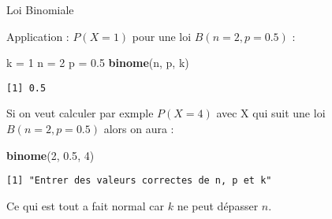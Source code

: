 \documentclass[
  ignorenonframetext,
]{beamer}
\newenvironment{Shaded}{\begin{snugshade}}{\end{snugshade}}
\newcommand{\DecValTok}[1]{\textcolor[rgb]{0.00,0.00,0.81}{#1}}
\newcommand{\FloatTok}[1]{\textcolor[rgb]{0.00,0.00,0.81}{#1}}
\newcommand{\FunctionTok}[1]{\textcolor[rgb]{0.13,0.29,0.53}{\textbf{#1}}}
\newcommand{\NormalTok}[1]{#1}
\newcommand{\OtherTok}[1]{\textcolor[rgb]{0.56,0.35,0.01}{#1}}
\begin{document}
\begin{frame}[fragile]{Loi Binomiale}
\protect\hypertarget{loi-binomiale-1}{}

Application : \(P(X=1)\) pour une loi \(B(n=2, p=0.5)\) :

\begin{Shaded}
\begin{Highlighting}[]
\NormalTok{k }\OtherTok{=} \DecValTok{1}
\NormalTok{n }\OtherTok{=} \DecValTok{2}
\NormalTok{p }\OtherTok{=} \FloatTok{0.5}
\FunctionTok{binome}\NormalTok{(n, p, k) }
\end{Highlighting}
\end{Shaded}

\begin{verbatim}
[1] 0.5
\end{verbatim}

Si on veut calculer par exmple \(P(X=4)\) avec X qui suit une loi
\(B(n=2, p=0.5)\) alors on aura :

\begin{Shaded}
\begin{Highlighting}[]
\FunctionTok{binome}\NormalTok{(}\DecValTok{2}\NormalTok{, }\FloatTok{0.5}\NormalTok{, }\DecValTok{4}\NormalTok{)}
\end{Highlighting}
\end{Shaded}

\begin{verbatim}
[1] "Entrer des valeurs correctes de n, p et k"
\end{verbatim}

Ce qui est tout a fait normal car \(k\) ne peut dépasser \(n\).
\end{frame}
\end{document}
